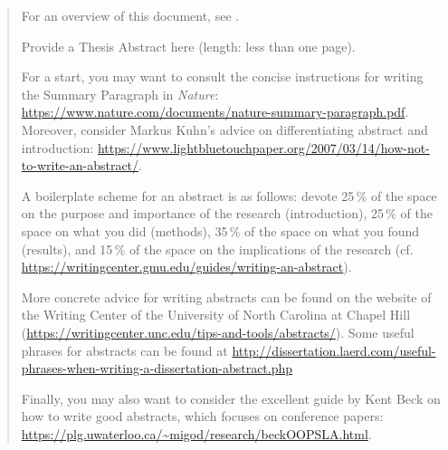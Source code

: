 \documentclass[
11pt, %
english, %
singlespacing, %
parskip, %
nohyperref, %
consistentlayout, %
]{PSIThesis} %
\begin{document}
\begin{abstract}

For an overview of this document, see .

Provide a Thesis Abstract here (length: less than one page).

For a start, you may want to consult the concise instructions for writing the Summary Paragraph in \emph{Nature}: \url{https://www.nature.com/documents/nature-summary-paragraph.pdf}. Moreover, consider Markus Kuhn's advice on differentiating abstract and introduction: \url{https://www.lightbluetouchpaper.org/2007/03/14/how-not-to-write-an-abstract/}.

A boilerplate scheme for an abstract is as follows: devote 25\,\% of the space on the purpose and importance of the research (introduction), 25\,\% of the space on what you did (methods), 35\,\% of the space on what you found (results), and 15\,\% of the space on the implications of the research (cf. \url{https://writingcenter.gmu.edu/guides/writing-an-abstract}).

More concrete advice for writing abstracts can be found on the website of the Writing Center of the University of North Carolina at Chapel Hill (\url{https://writingcenter.unc.edu/tips-and-tools/abstracts/}). Some useful phrases for abstracts can be found at \url{http://dissertation.laerd.com/useful-phrases-when-writing-a-dissertation-abstract.php}

Finally, you may also want to consider the excellent guide by Kent Beck on how to write good abstracts, which focuses on conference papers:
\url{https://plg.uwaterloo.ca/~migod/research/beckOOPSLA.html}.

\end{abstract}



%


\end{document}
